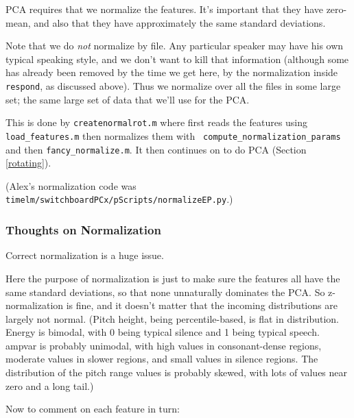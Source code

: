 \documentclass[11pt]{article}
\begin{document}
PCA requires that we normalize the features. It's important that they
have zero-mean, and also that they have approximately the same
standard deviations.

Note that we do {\em not} normalize by file.  Any particular speaker
may have his own typical speaking style, and we don't want to kill
that information (although some has already been removed by the time
we get here, by the normalization inside {\tt respond}, as discussed
above).  Thus we normalize over all the files in some large set; the
same large set of data that we'll use for the PCA.

This is done by {\tt createnormalrot.m} where first reads the features
using {\tt load\_features.m} then normalizes them with {\tt
  compute\_normalization\_params} and then {\tt fancy\_normalize.m}.
It then continues on to do PCA (Section \ref{rotating}).

(Alex's normalization code was {\tt
  timelm/switchboardPCx/pScripts/normalizeEP.py}.)


\subsubsection{Thoughts on Normalization}

Correct normalization is a huge issue.  

Here the purpose of normalization is just to make sure the features
all have the same standard deviations, so that none unnaturally
dominates the PCA.  So z-normalization is fine, and it doesn't matter
that the incoming distributions are largely not normal.  (Pitch
height, being percentile-based, is flat in distribution.  Energy is
bimodal, with 0 being typical silence and 1 being typical speech.
ampvar is probably unimodal, with high values in consonant-dense
regions, moderate values in slower regions, and small values in
silence regions.  The distribution of the pitch range values is
probably skewed, with lots of values near zero and a long tail.)


Now to comment on each feature in turn:
\end{document}
